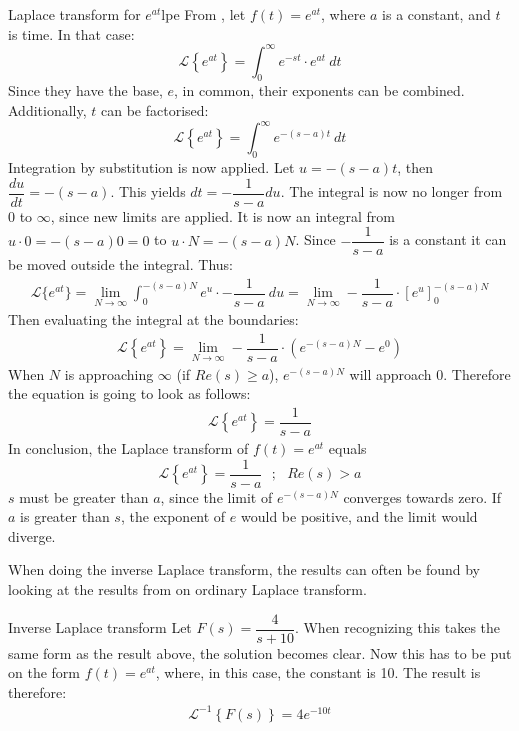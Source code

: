 \begin{example}{Laplace transform for $e^{at}$}{lpe}
From , let $f(t)=e^{at}$, where $a$ is a constant, and $t$ is time. In that case:
$$\mathcal{L} \left\{e^{at} \right\}=\int_{0}^{\infty} e^{-st}\cdot e^{at}\ dt$$
Since they have the base, $e$, in common, their exponents can be combined. Additionally, $t$ can be factorised:
$$\mathcal{L} \left\{e^{at} \right\}=\int_{0}^{\infty} e^{-(s-a)t}\ dt$$
Integration by substitution is now applied. Let $u = -(s-a)t$, then $\dfrac{du}{dt}=-(s-a)$. This yields $dt=-\dfrac{1}{s-a}du$. The integral is now no longer from 0 to $\infty$, since new limits are applied. It is now an integral from $u \cdot 0=-(s-a)0=0$ to $u\cdot N=-(s-a)N$. Since $-\dfrac{1}{s-a}$ is a constant it can be moved outside the integral. Thus:
\begin{align}
\mathcal{L}\{e^{at}\}=\lim_{N \to \infty} \int_{0}^{-(s-a)N} e^{u}\cdot -\dfrac{1}{s-a}\ du = \lim_{N \to \infty} -\dfrac{1}{s-a} \cdot \left[e^{u} \right]_{0}^{-(s-a)N}
\label{eq6.2}
\end{align}
Then evaluating the integral at the boundaries:
\begin{align*}
\mathcal{L} \left\{e^{at} \right\} =\lim_{N \to \infty} -\dfrac{1}{s-a}\cdot (e^{-(s-a)N}-e^{0})
\end{align*}
When $N$ is approaching $\infty$ (if $Re(s) \geq a$), $e^{-(s-a)N}$ will approach $0$. Therefore the equation is going to look as follows:
\begin{align}
\mathcal{L} \left\{e^{at} \right\} = \dfrac{1}{s-a}
\end{align}
In conclusion, the Laplace transform of $f(t)=e^{at}$ equals
$$\mathcal{L} \left\{e^{at} \right\} =\dfrac{1}{s-a} \ \ \ ;\ \ \ Re(s)>a$$
$s$ must be greater than $a$, since the limit of $e^{-(s-a)N}$ converges towards zero. If $a$ is greater than $s$, the exponent of $e$ would be positive, and the limit would diverge.
\end{example}
\noindent When doing the inverse Laplace transform, the results can often be found by looking at the results from on ordinary Laplace transform.
\begin{example}{Inverse Laplace transform}{}
Let $F(s) = \dfrac{4}{s+10}$. When recognizing this takes the same form as the result above, the solution becomes clear. Now this has to be put on the form $f(t)=e^{at}$, where, in this case, the constant is 10. The result is therefore:
\begin{align*}
\mathcal{L}^{-1} \left\{F(s) \right\} = 4e^{-10t}
\end{align*}
\end{example}
